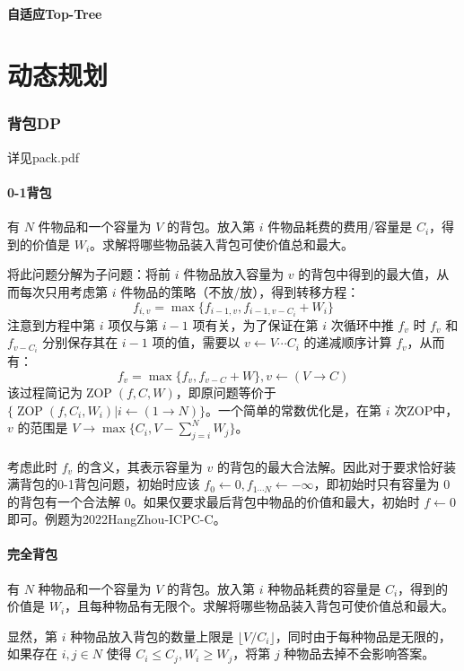\documentclass[12pt,a4paper]{article}
\begin{document}
\subsection{自适应Top-Tree}

\newpage
\part{动态规划}
\section{背包DP} 
详见pack.pdf
\subsection{0-1背包}
\begin{mdframed}[leftline=true, linewidth=2pt, linecolor=gray]
	有 $N$ 件物品和一个容量为 $V$ 的背包。放入第 $i$ 件物品耗费的费用/容量是 $C_i$，得到的价值是 $W_i$。求解将哪些物品装入背包可使价值总和最大。
\end{mdframed}
将此问题分解为子问题：将前 $i$ 件物品放入容量为 $v$ 的背包中得到的最大值，从而每次只用考虑第 $i$ 件物品的策略（不放/放），得到转移方程：
\begin{equation*}
	\displaystyle f_{i,v}=\max{\{f_{i-1,v}, f_{i-1,v-C_i}+W_i\}}
\end{equation*}
注意到方程中第 $i$ 项仅与第 $i-1$ 项有关，为了保证在第 $i$ 次循环中推 $f_v$ 时 $f_v$ 和 $f_{v-C_i}$ 分别保存其在 $i-1$ 项的值，需要以 $v\leftarrow V\cdots C_i$ 的递减顺序计算 $f_v$，从而有：
\begin{equation*}
	\displaystyle f_{v}=\max{\{f_{v}, f_{v-C}+W\}}, v\leftarrow (V\rightarrow C)
\end{equation*}
该过程简记为$\operatorname{ZOP}(f, C, W)$，即原问题等价于 $\{\operatorname{ZOP}(f, C_i,W_i)|i\leftarrow(1\rightarrow N)\}$。一个简单的常数优化是，在第 $i$ 次ZOP中，$v$ 的范围是 $\displaystyle V\rightarrow \max{\{C_i, V-\sum_{j=i}^{N}W_j\}}$。\\\\
考虑此时 $f_v$ 的含义，其表示容量为 $v$ 的背包的最大合法解。因此对于要求恰好装满背包的0-1背包问题，初始时应该 $f_0\leftarrow0,f_{1\cdots N}\leftarrow-\infty$，即初始时只有容量为 $0$ 的背包有一个合法解 $0$。如果仅要求最后背包中物品的价值和最大，初始时 $f\leftarrow0$ 即可。例题为2022HangZhou-ICPC-C。

\subsection{完全背包}
\begin{mdframed}[leftline=true, linewidth=2pt, linecolor=gray]
	有 $N$ 种物品和一个容量为 $V$ 的背包。放入第 $i$ 种物品耗费的容量是 $C_i$，得到的价值是 $W_i$，且每种物品有无限个。求解将哪些物品装入背包可使价值总和最大。
\end{mdframed}
显然，第 $i$ 种物品放入背包的数量上限是 $\displaystyle\lfloor V/C_i\rfloor$，同时由于每种物品是无限的，如果存在 $i,j\in N$ 使得 $C_i\le C_j,W_i\ge W_j$，将第 $j$ 种物品去掉不会影响答案。
\end{document}
